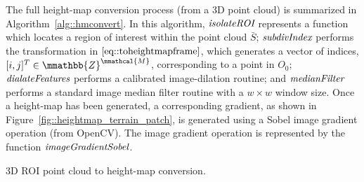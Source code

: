 			The full height-map conversion process (from a 3D point cloud) is summarized in Algorithm~\ref{alg::hmconvert}. In this algorithm, $\emph{\text{isolateROI}}$ represents a function which locates a region of interest within the point cloud $\bar{S}$; $\emph{\text{subdivIndex}}$ performs the transformation in $\ref{eq::toheightmapframe}$, which generates a vector of indices, $[i,j]^{T}\in\mmathbb{Z}^{\mmathcal{M}}$, corresponding to a point in $O_{0}$; $\emph{\text{dialateFeatures}}$ performs a calibrated image-dilation routine; and $\emph{\text{medianFilter}}$ performs a standard image median filter routine with a $w\times w$ window size. Once a height-map has been generated, a corresponding gradient, as shown in Figure~\ref{fig::heightmap_terrain_patch}, is generated using a Sobel image gradient operation (from OpenCV). The image gradient operation is represented by the function $\emph{\text{imageGradientSobel}}$.
			\begin{algorithm}
				\begin{algorithmic}
						\EndIf 
					\EndFor
				\end{algorithmic}	
				\caption{3D ROI point cloud to height-map conversion.}
				\label{alg::hmconvert}
			\end{algorithm}





